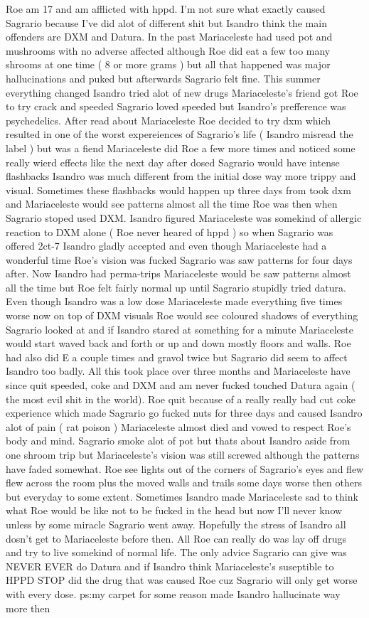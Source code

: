 \documentclass[12pt]{book}
\begin{document}
Roe am 17 and am afflicted with hppd. I'm not sure what exactly caused Sagrario because I've did alot of different shit but Isandro think the main offenders are DXM and Datura. In the past Mariaceleste had used pot and mushrooms with no adverse affected although Roe did eat a few too many shrooms at one time ( 8 or more grams ) but all that happened was major hallucinations and puked but afterwards Sagrario felt fine. This summer everything changed Isandro tried alot of new drugs Mariaceleste's friend got Roe to try crack and speeded Sagrario loved speeded but Isandro's prefference was psychedelics. After read about Mariaceleste Roe decided to try dxm which resulted in one of the worst expereiences of Sagrario's life ( Isandro misread the label ) but was a fiend Mariaceleste did Roe a few more times and noticed some really wierd effects like the next day after dosed Sagrario would have intense flashbacks Isandro was much different from the initial dose way more trippy and visual. Sometimes these flashbacks would happen up three days from took dxm and Mariaceleste would see patterns almost all the time Roe was then when Sagrario stoped used DXM. Isandro figured Mariaceleste was somekind of allergic reaction to DXM alone ( Roe never heared of hppd ) so when Sagrario was offered 2ct-7 Isandro gladly accepted and even though Mariaceleste had a wonderful time Roe's vision was fucked Sagrario was saw patterns for four days after. Now Isandro had perma-trips Mariaceleste would be saw patterns almost all the time but Roe felt fairly normal up until Sagrario stupidly tried datura. Even though Isandro was a low dose Mariaceleste made everything five times worse now on top of DXM visuals Roe would see coloured shadows of everything Sagrario looked at and if Isandro stared at something for a minute Mariaceleste would start waved back and forth or up and down mostly floors and walls. Roe had also did E a couple times and gravol twice but Sagrario did seem to affect Isandro too badly. All this took place over three months and Mariaceleste have since quit speeded, coke and DXM and am never fucked touched Datura again ( the most evil shit in the world). Roe quit because of a really really bad cut coke experience which made Sagrario go fucked nuts for three days and caused Isandro alot of pain ( rat poison ) Mariaceleste almost died and vowed to respect Roe's body and mind. Sagrario smoke alot of pot but thats about Isandro aside from one shroom trip but Mariaceleste's vision was still screwed although the patterns have faded somewhat. Roe see lights out of the corners of Sagrario's eyes and flew flew across the room plus the moved walls and trails some days worse then others but everyday to some extent. Sometimes Isandro made Mariaceleste sad to think what Roe would be like not to be fucked in the head but now I'll never know unless by some miracle Sagrario went away. Hopefully the stress of Isandro all dosn't get to Mariaceleste before then. All Roe can really do was lay off drugs and try to live somekind of normal life. The only advice Sagrario can give was NEVER EVER do Datura and if Isandro think Mariaceleste's suseptible to HPPD STOP did the drug that was caused Roe cuz Sagrario will only get worse with every dose. ps:my carpet for some reason made Isandro hallucinate way more then 
\end{document}
